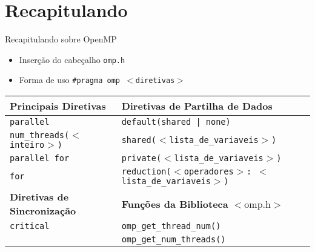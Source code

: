 \section{Recapitulando}
	\begin{frame}[fragile]{Recapitulando sobre OpenMP}
		\begin{itemize}
			\item Inserção do cabeçalho {\tt omp.h}
			\item Forma de uso {\tt \#\quad pragma omp $<$diretivas$>$}
		\end{itemize}
				\pause
		\begin{table}
		    \begin{tabular}{l|l}
		    \hline
		    \textbf{Principais Diretivas}           & \textbf{Diretivas de Partilha de Dados}                             \\ \hline
		    {\tt parallel                } & {\tt default(shared | none)                              } \\
		    {\tt num\_threads($<$inteiro$>$)} & {\tt shared($<$lista\_de\_variaveis$>$)                  } \\
		    {\tt parallel for            } & {\tt private($<$lista\_de\_variaveis$>$)                 } \\
		    {\tt for                     } & {\tt reduction($<$operadores$>$: $<$lista\_de\_variaveis$>$)} \\ \hline \hline

		   \textbf{ Diretivas de Sincronização}     & \textbf{Funções da Biblioteca} $<$omp.h$>$   \\ \hline

			{\tt critical                } & {\tt omp\_get\_thread\_num()      } \\
			{\tt ~                       } & {\tt omp\_get\_num\_threads()     } \\ \hline
		    \end{tabular}
		\end{table}
\end{frame}

